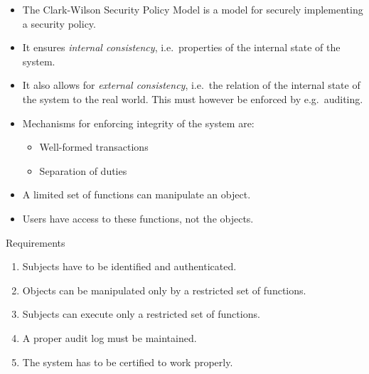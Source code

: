 \begin{frame}
  \begin{itemize}
    \item The Clark-Wilson Security Policy Model is a model for securely 
      implementing a security policy.

    \item It ensures \emph{internal consistency}, i.e.\ properties of the 
      internal state of the system.

    \item It also allows for \emph{external consistency}, i.e.\ the relation of 
      the internal state of the system to the real world.
      This must however be enforced by e.g.\ auditing.
  \end{itemize}
\end{frame}

\begin{frame}
  \begin{itemize}
    \item Mechanisms for enforcing integrity of the system are:
      \begin{itemize}
        \item Well-formed transactions

        \item Separation of duties
      \end{itemize}
  \end{itemize}

  \pause{}

  \begin{definition}
    \begin{itemize}
      \item A limited set of functions can manipulate an object.
      \item Users have access to these functions, not the objects.
    \end{itemize}
  \end{definition}
\end{frame}

\begin{frame}
  \begin{block}{Requirements}
    \begin{enumerate}
      \item Subjects have to be identified and authenticated.
      \item Objects can be manipulated only by a restricted set of functions.
      \item Subjects can execute only a restricted set of functions.
      \item A proper audit log must be maintained.
      \item The system has to be certified to work properly.
    \end{enumerate}
  \end{block}
\end{frame}


